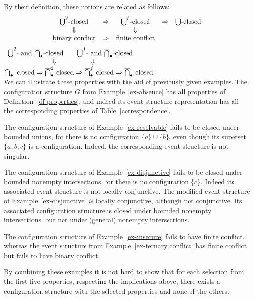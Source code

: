 \documentclass[twocolumn]{article}
\newcommand{\df}[1]{Definition~\ref{df-#1}}
\newcommand{\ex}[1]{Example~\ref{ex-#1}}
\begin{document}
By their definition, these notions are related as follows:\vspace{-1ex}
$$\begin{array}{ccccc}
\overline{\bigcup}^2\mbox{-closed}&\Rightarrow&\overline{\bigcup}^f\mbox{-closed}&\Rightarrow&
\overline{\bigcup}\mbox{-closed}\\
\Downarrow && \Downarrow \\
\mbox{binary conflict} &\Rightarrow&\mbox{finite conflict}
\end{array}$$
$\hfill\begin{array}[b]{r@{~~~~~~}l}
\bbbigcup\mbox{- and } \nbbigcap\mbox{-closed}
& \fbbigcup\mbox{- and } \nbbigcap\mbox{-closed}\\
\Downarrow~~~&~~~~~~\Downarrow
\end{array}\hfill$\vspace{-1ex}
$\nbigcap\mbox{-closed}   \hfill\implies\hfill
\nbbigcap^2\mbox{-closed} \hfill\implies\hfill
\nbbigcap^f\mbox{-closed} \hfill\implies\hfill
\nbbigcap\mbox{-closed.}$
\vspace{2mm}
\\
We can illustrate these properties with the aid of previously given
examples.
The configuration structure $G$ from \ex{absence} has all properties
of \df{properties}, and indeed its event structure representation has
all the corresponding properties of Table~\ref{correspondence}.

The configuration structure of \ex{resolvable} fails to be
closed under bounded unions, for there is no configuration $\{a\}\cup
\{b\}$, even though its superset $\{a,b,c\}$ is a configuration.
Indeed, the corresponding event structure is not singular.

The configuration structure of \ex{disjunctive} fails to be closed
under bounded nonempty intersections, for there is no configuration $\{c\}$.
Indeed its associated event structure is not locally conjunctive.
The modified event structure of \ex{disjunctive} \emph{is} locally
conjunctive, although not conjunctive. Its associated configuration
structure is closed under bounded nonempty intersections, but not
under (general) nonempty intersections.

The configuration structure of \ex{insecure} fails to have finite
conflict, whereas the event structure from \ex{ternary conflict} has
finite conflict but fails to have binary conflict.

By combining these examples it is not hard to show that for each
selection from the first five properties, respecting the implications
above, there exists a configuration structure with the selected
properties and none of the others.
\end{document}

